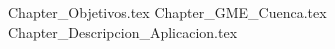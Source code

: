 \documentclass[a4paper,openany,oneside,12pt]{book}
\begin{document}

%	
	\newpage
	\mbox{}
	\thispagestyle{empty} %
	


	\tableofcontents
	\listoffigures %
	\listoftables
	

	


	{Chapter_Objetivos.tex}
	{Chapter_GME_Cuenca.tex}
	{Chapter_Descripcion_Aplicacion.tex}

\end{document}
